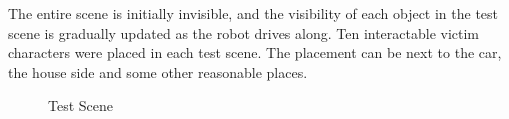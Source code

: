 The entire scene is initially invisible, and the visibility of each object in the test scene is gradually updated as the robot drives along. Ten interactable victim characters were placed in each test scene. The placement can be next to the car, the house side and some other reasonable places.

\begin{figure}[htbp]
    \centering
    \caption{Test Scene}
    \label{fig:testscene} 
\end{figure}
